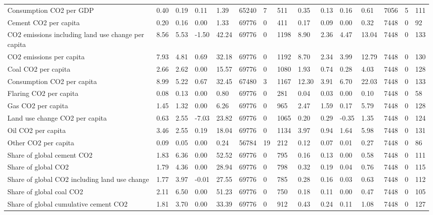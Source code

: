 \begin{longtable}{lllllllllllllll}
\addlinespace
Consumption CO2 per GDP & 0.40 & 0.19 & 0.11 & 1.39 & 65240 & 7 & 511 & 0.35 & 0.13 & 0.16 & 0.61 & 7056 & 5 & 111\\
Cement CO2 per capita & 0.20 & 0.16 & 0.00 & 1.33 & 69776 & 0 & 411 & 0.17 & 0.09 & 0.00 & 0.32 & 7448 & 0 & 92\\
CO2 emissions including land use change per capita & 8.56 & 5.53 & -1.50 & 42.24 & 69776 & 0 & 1198 & 8.90 & 2.36 & 4.47 & 13.04 & 7448 & 0 & 133\\
CO2 emissions per capita & 7.93 & 4.81 & 0.69 & 32.18 & 69776 & 0 & 1192 & 8.70 & 2.34 & 3.99 & 12.79 & 7448 & 0 & 130\\
Coal CO2 per capita & 2.66 & 2.62 & 0.00 & 15.57 & 69776 & 0 & 1080 & 1.93 & 0.74 & 0.28 & 4.03 & 7448 & 0 & 128\\
\addlinespace
Consumption CO2 per capita & 8.99 & 5.22 & 0.67 & 32.45 & 67480 & 3 & 1167 & 12.30 & 3.91 & 6.70 & 22.03 & 7448 & 0 & 133\\
Flaring CO2 per capita & 0.08 & 0.13 & 0.00 & 0.80 & 69776 & 0 & 281 & 0.04 & 0.03 & 0.00 & 0.10 & 7448 & 0 & 58\\
Gas CO2 per capita & 1.45 & 1.32 & 0.00 & 6.26 & 69776 & 0 & 965 & 2.47 & 1.59 & 0.17 & 5.79 & 7448 & 0 & 128\\
Land use change CO2 per capita & 0.63 & 2.55 & -7.03 & 23.82 & 69776 & 0 & 1065 & 0.20 & 0.29 & -0.35 & 1.35 & 7448 & 0 & 124\\
Oil CO2 per capita & 3.46 & 2.55 & 0.19 & 18.04 & 69776 & 0 & 1134 & 3.97 & 0.94 & 1.64 & 5.98 & 7448 & 0 & 131\\
\addlinespace
Other CO2 per capita & 0.09 & 0.05 & 0.00 & 0.24 & 56784 & 19 & 212 & 0.12 & 0.07 & 0.01 & 0.27 & 7448 & 0 & 86\\
Share of global cement CO2 & 1.83 & 6.36 & 0.00 & 52.52 & 69776 & 0 & 795 & 0.16 & 0.13 & 0.00 & 0.58 & 7448 & 0 & 111\\
Share of global CO2 & 1.79 & 4.36 & 0.00 & 28.94 & 69776 & 0 & 798 & 0.32 & 0.19 & 0.04 & 0.76 & 7448 & 0 & 115\\
Share of global CO2 including land use change & 1.77 & 3.97 & -0.01 & 27.55 & 69776 & 0 & 785 & 0.28 & 0.16 & 0.03 & 0.63 & 7448 & 0 & 112\\
Share of global coal CO2 & 2.11 & 6.50 & 0.00 & 51.23 & 69776 & 0 & 750 & 0.18 & 0.11 & 0.00 & 0.47 & 7448 & 0 & 105\\
\addlinespace
Share of global cumulative cement CO2 & 1.81 & 3.70 & 0.00 & 33.39 & 69776 & 0 & 912 & 0.43 & 0.24 & 0.11 & 1.08 & 7448 & 0 & 127\\

\end{longtable}
